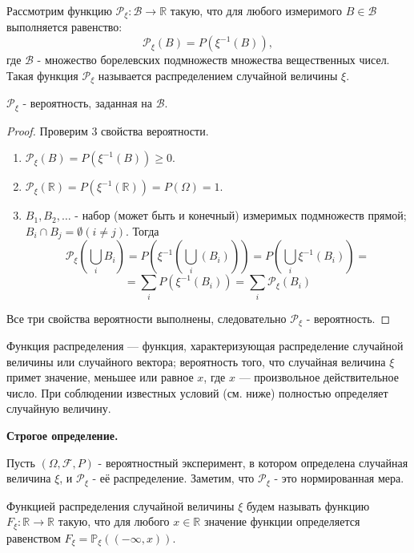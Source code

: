 \begin{definition}
	Рассмотрим функцию $\mathcal{P}_{\xi}: \mathcal{B} \to \mathbb{R}$ такую, что для любого измеримого $B \in \mathcal{B}$ выполняется равенство:
	\[ \mathcal{P}_{\xi} (B) = P (\xi^{-1} (B)), \]
	где $\mathcal{B}$ - множество борелевских подмножеств множества вещественных чисел. Такая функция $\mathcal{P}_{\xi}$ называется распределением случайной величины $\xi$.
\end{definition}

\begin{theorem}
	$\mathcal{P}_{\xi}$ - вероятность, заданная на $\mathcal{B}$.
	\begin{proof}
		Проверим 3 свойства вероятности.
		\begin{enumerate}
			\item $\mathcal{P}_{\xi} (B) = P(\xi^{-1} (B)) \ge 0$.
			\item $\mathcal{P}_{\xi} (\mathbb{R}) = P(\xi^{-1} (\mathbb{R})) = P(\Omega) = 1$.
			\item $B_1, B_2, \dots$ - набор (может быть и конечный) измеримых подмножеств прямой; $B_i \cap B_j = \emptyset (i \ne j)$. Тогда
			\[ \mathcal{P}_{\xi} \left( \bigcup_i B_i \right) = P \left( \xi^{-1} \left( \bigcup_i (B_i) \right) \right) = P \left( \bigcup_i \xi^{-1} (B_i) \right) = \]
			\[ = \sum_{i} P(\xi^{-1} (B_i)) = \sum_{i} \mathcal{P}_{\xi} (B_i) \]
		\end{enumerate}
		Все три свойства вероятности выполнены, следовательно $\mathcal{P}_{\xi}$ - вероятность.
	\end{proof}
\end{theorem}

\begin{definition}
	Функция распределения — функция, характеризующая распределение случайной величины или случайного вектора; вероятность того, что случайная величина $\xi$ примет значение, меньшее или равное $x$, где $x$ — произвольное действительное число. При соблюдении известных условий (см. ниже) полностью определяет случайную величину.
	
	\textbf{Строгое определение.}
	
	\noindent Пусть $(\Omega, \mathcal{F}, P)$ - вероятностный эксперимент, в котором определена случайная величина $\xi$, и $\mathcal{P}_{\xi}$ - её распределение. Заметим, что $\mathcal{P}_{\xi}$ - это нормированная мера.
	
	Функцией распределения случайной величины $\xi$ будем называть функцию $F_{\xi}: \mathbb{R} \to \mathbb{R}$ такую, что для любого $x \in \mathbb{R}$ значение функции определяется равенством $F_{\xi} = \mathbb{P}_{\xi} ( (-\infty, x) )$.
\end{definition}

